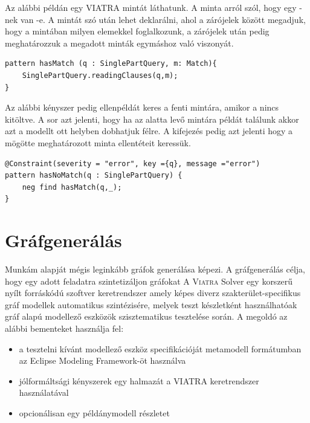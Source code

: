 Az alábbi példán egy  \textsc{VIATRA} mintát láthatunk. A minta arról szól, hogy egy -nek van -e. A mintát  szó után lehet deklarálni, ahol a zárójelek között megadjuk, hogy a mintában milyen elemekkel foglalkozunk, a zárójelek után pedig meghatározzuk a megadott minták egymáshoz való viszonyát.

\begin{lstlisting}[style=viatrasmall]
pattern hasMatch (q : SinglePartQuery, m: Match){
	SinglePartQuery.readingClauses(q,m);
}
\end{lstlisting}  

 Az alábbi kényszer pedig ellenpéldát keres a fenti mintára, amikor a  nincs kitöltve. A  sor azt jelenti, hogy ha az alatta levő mintára példát találunk akkor azt a modellt ott helyben dobhatjuk félre. A  kifejezés pedig azt jelenti hogy a mögötte meghatározott minta ellentéteit keressük.

\begin{lstlisting}[style=viatrasmall]
@Constraint(severity = "error", key ={q}, message ="error")
pattern hasNoMatch(q : SinglePartQuery) {
    neg find hasMatch(q,_);
}
\end{lstlisting}  


 

\section{Gráfgenerálás}
Munkám alapját mégis leginkább gráfok generálása képezi. A gráfgenerálás célja, hogy egy adott feladatra szintetizáljon gráfokat  A \textsc{Viatra} Solver \cite{viatrasolver} egy korszerű nyílt forráskódú szoftver keretrendszer amely képes diverz szakterület-specifikus gráf modellek automatikus szintézisére, melyek teszt készletként használhatóak gráf alapú modellező eszközök szisztematikus tesztelése során. A megoldó az alábbi bementeket használja fel: 
\begin{itemize}
	\item a tesztelni kívánt modellező eszköz specifikációját metamodell formátumban az Eclipse Modeling Framework-öt használva
	\item jólformáltsági kényszerek egy halmazát a  \textsc{VIATRA} keretrendszer használatával
	\item opcionálisan egy példánymodell részletet
\end{itemize}

